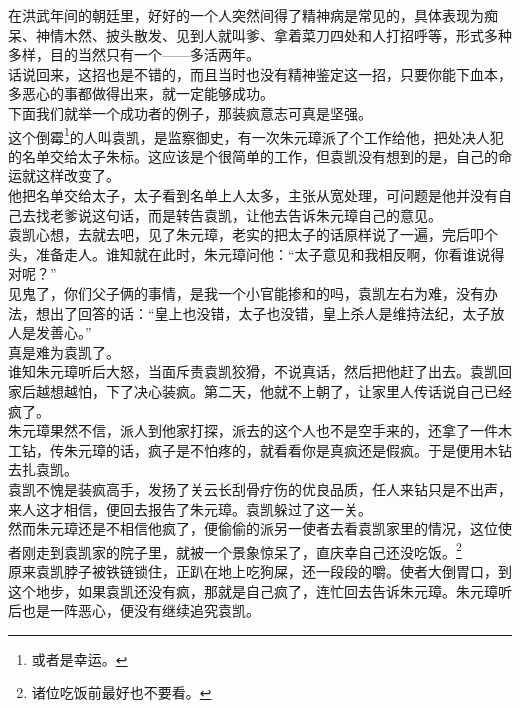 \begin{multicols}{\theparacolNo}
在洪武年间的朝廷里，好好的一个人突然间得了精神病是常见的，具体表现为痴呆、神情木然、披头散发、见到人就叫爹、拿着菜刀四处和人打招呼等，形式多种多样，目的当然只有一个——多活两年。\\

话说回来，这招也是不错的，而且当时也没有精神鉴定这一招，只要你能下血本，多恶心的事都做得出来，就一定能够成功。\\

下面我们就举一个成功者的例子，那装疯意志可真是坚强。\\

这个倒霉\footnote{或者是幸运。}的人叫袁凯，是监察御史，有一次朱元璋派了个工作给他，把处决人犯的名单交给太子朱标。这应该是个很简单的工作，但袁凯没有想到的是，自己的命运就这样改变了。\\

他把名单交给太子，太子看到名单上人太多，主张从宽处理，可问题是他并没有自己去找老爹说这句话，而是转告袁凯，让他去告诉朱元璋自己的意见。\\

袁凯心想，去就去吧，见了朱元璋，老实的把太子的话原样说了一遍，完后叩个头，准备走人。谁知就在此时，朱元璋问他：“太子意见和我相反啊，你看谁说得对呢？”\\

见鬼了，你们父子俩的事情，是我一个小官能掺和的吗，袁凯左右为难，没有办法，想出了回答的话：“皇上也没错，太子也没错，皇上杀人是维持法纪，太子放人是发善心。”\\

真是难为袁凯了。\\

谁知朱元璋听后大怒，当面斥责袁凯狡猾，不说真话，然后把他赶了出去。袁凯回家后越想越怕，下了决心装疯。第二天，他就不上朝了，让家里人传话说自己已经疯了。\\

朱元璋果然不信，派人到他家打探，派去的这个人也不是空手来的，还拿了一件木工钻，传朱元璋的话，疯子是不怕疼的，就看看你是真疯还是假疯。于是便用木钻去扎袁凯。\\

袁凯不愧是装疯高手，发扬了关云长刮骨疗伤的优良品质，任人来钻只是不出声，来人这才相信，便回去报告了朱元璋。袁凯躲过了这一关。\\

然而朱元璋还是不相信他疯了，便偷偷的派另一使者去看袁凯家里的情况，这位使者刚走到袁凯家的院子里，就被一个景象惊呆了，直庆幸自己还没吃饭。\footnote{诸位吃饭前最好也不要看。}\\

原来袁凯脖子被铁链锁住，正趴在地上吃狗屎，还一段段的嚼。使者大倒胃口，到这个地步，如果袁凯还没有疯，那就是自己疯了，连忙回去告诉朱元璋。朱元璋听后也是一阵恶心，便没有继续追究袁凯。\\


\end{multicols}
